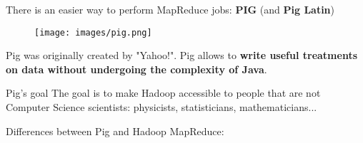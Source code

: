 \documentclass{beamer}[10pt, usepdftitle=false handout]
\begin{document}
\begin{frame}
There is an easier way to perform MapReduce jobs: \textbf{PIG} (and \textbf{Pig Latin})
\vspace*{0.6em}

\begin{figure}
\texttt{[image: images/pig.png]} 
\end{figure}	


Pig was originally created by "Yahoo!". Pig allows to \textbf{write useful treatments on data without undergoing the complexity of Java}. 

\begin{block}{Pig's goal}
The goal is to make Hadoop accessible to people that are not Computer Science scientists: physicists, statisticians, mathematicians...
\end{block}

\end{frame}
\begin{frame}

Differences between Pig and Hadoop MapReduce:
\vspace*{0.6em}

\begin{center}
	\end{center}

\end{frame}
\end{document}
